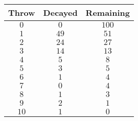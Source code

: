 \begin{tabular}{ccc}          \toprule
Throw & Decayed & Remaining \\\midrule
$0$   & $0$     & $100$     \\[4pt]
$1$   & $49$    & $51$      \\[4pt]
$2$   & $24$    & $27$      \\[4pt]
$3$   & $14$    & $13$      \\[4pt]
$4$   & $5$     & $8$       \\[4pt]
$5$   & $3$     & $5$       \\[4pt]
$6$   & $1$     & $4$       \\[4pt]
$7$   & $0$     & $4$       \\[4pt]
$8$   & $1$     & $3$       \\[4pt]
$9$   & $2$     & $1$       \\[4pt]
$10$  & $1$     & $0$       \\\bottomrule
\end{tabular}

